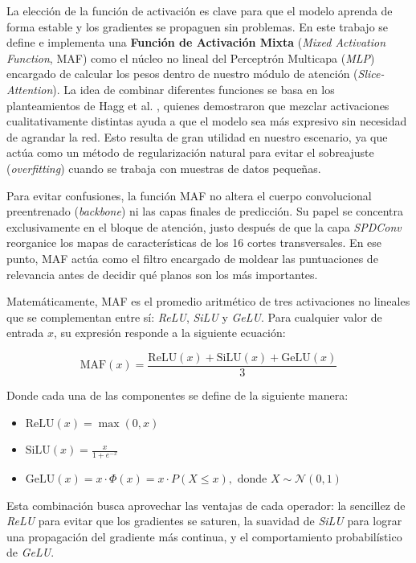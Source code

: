 \documentclass[12pt, oneside, english, spanish]{book}
\begin{document}
La elección de la función de activación es clave para que el modelo aprenda de forma estable y los gradientes se propaguen sin problemas. En este trabajo se define e implementa una \textbf{Función de Activación Mixta} (\textit{Mixed Activation Function}, MAF) como el núcleo no lineal del Perceptrón Multicapa (\textit{MLP}) encargado de calcular los pesos dentro de nuestro módulo de atención (\textit{Slice-Attention}). La idea de combinar diferentes funciones se basa en los planteamientos de Hagg et al. \cite{hagg2017evolving}, quienes demostraron que mezclar activaciones cualitativamente distintas ayuda a que el modelo sea más expresivo sin necesidad de agrandar la red. Esto resulta de gran utilidad en nuestro escenario, ya que actúa como un método de regularización natural para evitar el sobreajuste (\textit{overfitting}) cuando se trabaja con muestras de datos pequeñas.

Para evitar confusiones, la función MAF no altera el cuerpo convolucional preentrenado (\textit{backbone}) ni las capas finales de predicción. Su papel se concentra exclusivamente en el bloque de atención, justo después de que la capa \textit{SPDConv} reorganice los mapas de características de los 16 cortes transversales. En ese punto, MAF actúa como el filtro encargado de moldear las puntuaciones de relevancia antes de decidir qué planos son los más importantes.

Matemáticamente, MAF es el promedio aritmético de tres activaciones no lineales que se complementan entre sí: \textit{ReLU}, \textit{SiLU} y \textit{GeLU}. Para cualquier valor de entrada $x$, su expresión responde a la siguiente ecuación:

\begin{equation}
	\text{MAF}(x) = \frac{\text{ReLU}(x) + \text{SiLU}(x) + \text{GeLU}(x)}{3}
\end{equation}

Donde cada una de las componentes se define de la siguiente manera:

\begin{itemize}
	\item $\text{ReLU}(x) = \max(0, x)$
	\item $\text{SiLU}(x) = \frac{x}{1 + e^{-x}}$
	\item $\text{GeLU}(x) = x \cdot \Phi(x) = x \cdot P(X \le x), \text{ donde } X \sim \mathcal{N}(0, 1)$
\end{itemize}

Esta combinación busca aprovechar las ventajas de cada operador: la sencillez de \textit{ReLU} para evitar que los gradientes se saturen, la suavidad de \textit{SiLU} para lograr una propagación del gradiente más continua, y el comportamiento probabilístico de \textit{GeLU}.
\end{document}
